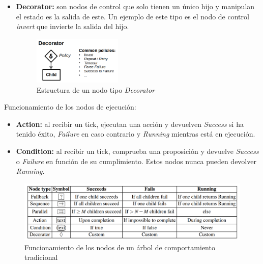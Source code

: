 \begin{itemize}
    \item \textbf{Decorator:} son nodos de control que solo tienen un único hijo y manipulan el estado es la salida de este. Un ejemplo de este tipo es el nodo de control \textit{invert} que invierte la salida del hijo.

    \begin{figure}[H]
        \centering
        \includegraphics[width=0.4\textwidth]{figures/fundamentos/bt-decorator.png}
        \caption{Estructura de un nodo tipo \textit{Decorator}}
        \label{fig:parallel}
    \end{figure}
    
\end{itemize}

\noindent Funcionamiento de los nodos de ejecución:

\begin{itemize}
    \item \textbf{Action:} al recibir un tick, ejecutan una acción y devuelven \textit{Success} si ha tenido éxito, \textit{Failure} en caso contrario y \textit{Running} mientras está en ejecución. 

    \item \textbf{Condition:} al recibir un tick, comprueba una proposición y devuelve \textit{Success} o \textit{Failure} en función de su cumplimiento. Estos nodos nunca pueden devolver \textit{Running}.
    
\end{itemize}

\begin{figure}[H]
    \centering
    \includegraphics[width=\textwidth]{figures/fundamentos/node_types.png}
    \caption{Funcionamiento de los nodos de un árbol de comportamiento tradicional}
    \label{fig:ejemplo2}
\end{figure}

